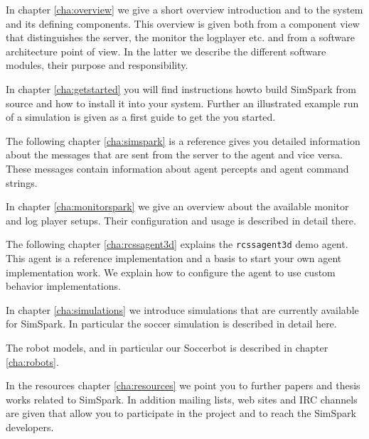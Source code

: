 In chapter \ref{cha:overview} we give a short overview introduction
and to the system and its defining components. This overview is given
both from a component view that distinguishes the server, the monitor
the logplayer etc. and from a software architecture point of view. In
the latter we describe the different software modules, their purpose
and responsibility.

In chapter \ref{cha:getstarted} you will find instructions howto build
SimSpark from source and how to install it into your system. Further
an illustrated example run of a simulation is given as a first guide
to get the you started.

The following chapter \ref{cha:simspark} is a reference gives you
detailed information about the messages that are sent from the server
to the agent and vice versa. These messages contain information about
agent percepts and agent command strings.

In chapter \ref{cha:monitorspark} we give an overview about the
available monitor and log player setups. Their configuration and usage
is described in detail there.

The following chapter \ref{cha:rcssagent3d} explains the
\texttt{rcssagent3d} demo agent. This agent is a reference implementation and 
a basis to start your own agent implementation work. We explain how
to configure the agent to use custom behavior implementations.

In chapter \ref{cha:simulations} we introduce simulations that are
currently available for SimSpark. In particular the soccer simulation
is described in detail here.

The robot models, and in particular our Soccerbot is described in
chapter \ref{cha:robots}.

In the resources chapter \ref{cha:resources} we point you to further
papers and thesis works related to SimSpark. In addition mailing
lists, web sites and IRC channels are given that allow you to
participate in the project and to reach the SimSpark developers.


